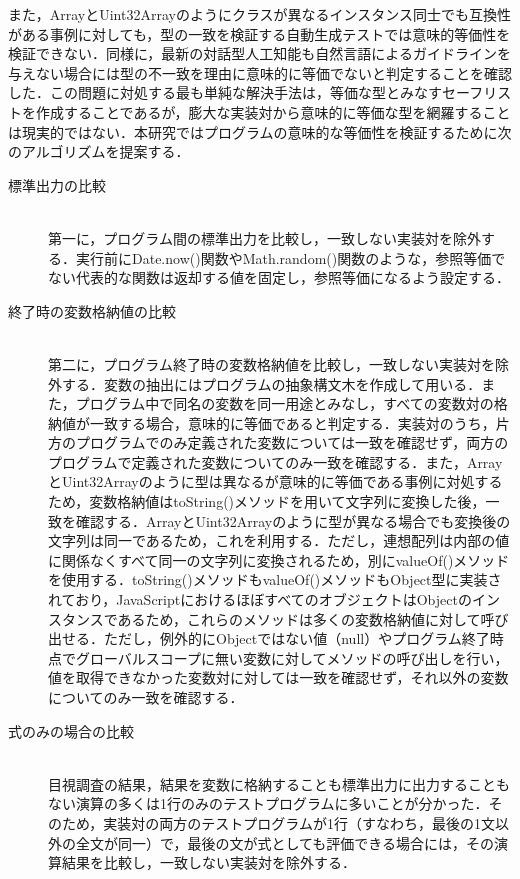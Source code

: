 \documentclass[submit,techrep,noauthor]{ipsj}
\begin{document}
また，ArrayとUint32Arrayのようにクラスが異なるインスタンス同士でも互換性がある事例に対しても，型の一致を検証する自動生成テストでは意味的等価性を検証できない．同様に，最新の対話型人工知能も自然言語によるガイドラインを与えない場合には型の不一致を理由に意味的に等価でないと判定することを確認した．この問題に対処する最も単純な解決手法は，等価な型とみなすセーフリストを作成することであるが，膨大な実装対から意味的に等価な型を網羅することは現実的ではない．本研究ではプログラムの意味的な等価性を検証するために次のアルゴリズムを提案する．

\begin{description}

\item[標準出力の比較]\mbox{}\\
第一に，プログラム間の標準出力を比較し，一致しない実装対を除外する．実行前にDate.now()関数やMath.random()関数のような，参照等価でない代表的な関数は返却する値を固定し，参照等価になるよう設定する．

\item[終了時の変数格納値の比較]\mbox{}\\
第二に，プログラム終了時の変数格納値を比較し，一致しない実装対を除外する．変数の抽出にはプログラムの抽象構文木を作成して用いる．また，プログラム中で同名の変数を同一用途とみなし，すべての変数対の格納値が一致する場合，意味的に等価であると判定する．実装対のうち，片方のプログラムでのみ定義された変数については一致を確認せず，両方のプログラムで定義された変数についてのみ一致を確認する．また，ArrayとUint32Arrayのように型は異なるが意味的に等価である事例に対処するため，変数格納値はtoString()メソッドを用いて文字列に変換した後，一致を確認する．ArrayとUint32Arrayのように型が異なる場合でも変換後の文字列は同一であるため，これを利用する．ただし，連想配列は内部の値に関係なくすべて同一の文字列に変換されるため，別にvalueOf()メソッドを使用する．toString()メソッドもvalueOf()メソッドもObject型に実装されており，JavaScriptにおけるほぼすべてのオブジェクトはObjectのインスタンスであるため，これらのメソッドは多くの変数格納値に対して呼び出せる．ただし，例外的にObjectではない値（null）やプログラム終了時点でグローバルスコープに無い変数に対してメソッドの呼び出しを行い，値を取得できなかった変数対に対しては一致を確認せず，それ以外の変数についてのみ一致を確認する．

\item[式のみの場合の比較]\mbox{}\\
目視調査の結果，結果を変数に格納することも標準出力に出力することもない演算の多くは1行のみのテストプログラムに多いことが分かった．そのため，実装対の両方のテストプログラムが1行（すなわち，最後の1文以外の全文が同一）で，最後の文が式としても評価できる場合には，その演算結果を比較し，一致しない実装対を除外する．

\end{description}
\end{document}
